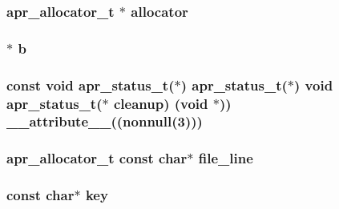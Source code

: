 \subsubsection[{\texorpdfstring{allocator}{allocator}}]{ {\bf apr\+\_\+allocator\+\_\+t} $\ast$ allocator}\hypertarget{group__apr__pools_ga3d4c7b6ba19a3b46b6fecdee3d867787}{}\label{group__apr__pools_ga3d4c7b6ba19a3b46b6fecdee3d867787}
\subsubsection[{\texorpdfstring{b}{b}}]{$\ast$ b}\hypertarget{group__apr__pools_ga2e9e9d1380aacd6ec8b616ae04374821}{}\label{group__apr__pools_ga2e9e9d1380aacd6ec8b616ae04374821}
\subsubsection[{\texorpdfstring{cleanup}{cleanup}}]{\setlength{\rightskip}{0pt plus 5cm}const {\bf void} {\bf apr\+\_\+status\+\_\+t}($\ast$) {\bf apr\+\_\+status\+\_\+t}($\ast$) {\bf void} {\bf apr\+\_\+status\+\_\+t}($\ast$ cleanup) ({\bf void} $\ast$)) {\bf \+\_\+\+\_\+attribute\+\_\+\+\_\+}((nonnull(3)))}\hypertarget{group__apr__pools_ga36572a384d49086c60d5aeec6fea04fc}{}\label{group__apr__pools_ga36572a384d49086c60d5aeec6fea04fc}
\subsubsection[{\texorpdfstring{file\+\_\+line}{file_line}}]{ {\bf apr\+\_\+allocator\+\_\+t} const char$\ast$ file\+\_\+line}\hypertarget{group__apr__pools_ga6ff83cbf1d5de0befaa318c392539164}{}\label{group__apr__pools_ga6ff83cbf1d5de0befaa318c392539164}
\subsubsection[{\texorpdfstring{key}{key}}]{\setlength{\rightskip}{0pt plus 5cm}const char$\ast$ key}\hypertarget{group__apr__pools_gacd3d88da3c0e0313c3645ff34f62f542}{}\label{group__apr__pools_gacd3d88da3c0e0313c3645ff34f62f542}
